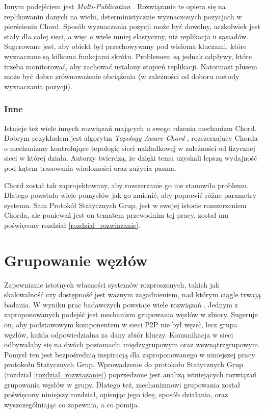 \documentclass[12pt, twoside, openany]{report}
\begin{document}
Innym podejściem jest \textit{Multi-Publication} \cite{bib:paiva}. Rozwiązanie te opiera się na replikowaniu danych na wielu, deterministycznie wyznaczonych pozycjach w pierścieniu Chord. Sposób wyznaczania pozycji może być dowolny, aczkolwiek jest stały dla całej sieci, a więc o wiele mniej elastyczny, niż replikacja u sąsiadów. Sugerowane jest, aby obiekt był przechowywany pod wieloma kluczami, które wyznaczane są kilkoma funkcjami skrótu. Problemem są jednak odpływy, które trzeba monitorować, aby zachować ustalony stopień replikacji. Natomiast plusem może być dobre zrównoważenie obciążenia (w zależności od doboru metody wyznaczania pozycji).

\subsection{Inne}

Istnieje też wiele innych rozwiązań mających u swego rdzenia mechanizm Chord. Dobrym przykładem jest algorytm \textit{Topology Aware Chord} \cite{bib:tac}, rozszerzający Chorda o mechanizmy kontrolujące topologię sieci nakładkowej w zależności od fizycznej sieci w której działa. Autorzy twierdzą, że dzięki temu uzyskali lepszą wydajność pod kątem trasowania wiadomości oraz zużycia pasma.

Chord został tak zaprojektowany, aby rozszerzanie go nie stanowiło problemu. Dlatego powstało wiele pomysłów jak go zmienić, aby poprawić różne parametry systemu. Sam Protokół Statycznych Grup, jest w swojej istocie rozszerzeniem Chorda, ale ponieważ jest on tematem przewodnim tej pracy, został mu poświęcony rozdział \ref{rozdzial_rozwiazanie}.


\chapter{Grupowanie węzłów}
\label{rozdzial_grupowanie}

Zapewnianie istotnych własności systemów rozproszonych, takich jak skalowalność czy dostępność jest ważnym zagadnieniem, nad którym ciągle trwają badania. W wyniku prac badawczych powstaje wiele rozwiązań \cite{bib:martins, bib:jeyasheeli, bib:ye, bib:paiva, bib:chord, bib:knezevic, bib:rao, bib:tac, bib:scatter, bib:rollerchain}. Jednym z zaproponowanych podejść jest mechanizm grupowania węzłów w zbiory. Sugeruje on, aby podstawowym komponentem w sieci P2P nie był węzeł, lecz grupa węzłów, każda odpowiedzialna za dany zbiór kluczy. Komunikacja w sieci odbywałaby się na dwóch poziomach: międzygrupowym oraz wewnątrzgrupowym. Pomysł ten jest bezpośrednią inspiracją dla zaproponowanego w niniejszej pracy protokołu Statycznych Grup. Wprowadzenie do protokołu Statycznych Grup (rozdział \ref{rozdzial_rozwiazanie}) poprzedzone jest analizą istniejących rozwiązań grupowania węzłów w grupy. Dlatego też, mechanizmowi grupowania został poświęcony niniejszy rozdział, opisując jego ideę, sposób działania, oraz wyszczególniając co zapewnia, a co pomija.
\end{document}
